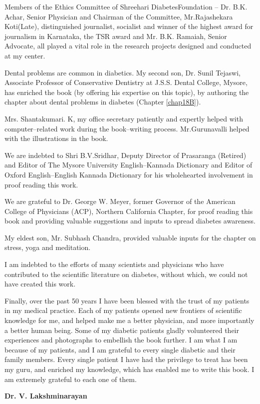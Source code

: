 Members of the Ethics Committee of Shreehari Diabetes\break Foundation – Dr. B.K. Achar, Senior Physician and Chairman of the Committee, Mr.Rajashekara Koti(Late), distinguished journa\-list, socia\-list and winner of the highest award for journalism in Karnataka, the TSR award and Mr. B.K. Ramaiah, Senior Advocate, all played a vital role in the research projects designed and conducted at my center.

Dental problems are common in diabetics. My second son, Dr. Sunil Tejaswi, Associate Professor of Conservative Dentistry at J.S.S. Dental College, Mysore, has enriched the book (by offering his expertise on this topic), by authoring the chapter about dental problems in diabetes (Chapter \ref{chap18B}).

Mrs. Shantakumari. K, my office secretary patiently and expertly helped with computer–related work during the book–writing process. Mr.Gurunavalli helped with the illustrations in the book.

We are indebted to Shri B.V.Sridhar, Deputy Director of Prasaranga (Retired) and Editor of The Mysore University English–Kannada Dictionary and Editor of Oxford English–English Kannada Dictionary for his wholehearted involvement in proof reading this work.

We are grateful to Dr. George W. Meyer, former Governor of the American College of Physicians (ACP), Northern California Chapter, for proof reading this book and providing valuable suggestions and inputs to spread diabetes awareness.

My eldest son, Mr. Subhash Chandra, provided valuable inputs for the chapter on stress, yoga and meditation.

I am indebted to the efforts of many scientists and physicians who have contributed to the scientific literature on diabetes, without which, we could not have created this work.

Finally, over the past 50 years I have been blessed with the trust of my patients in my medical practice. Each of my patients opened new frontiers of scientific knowledge for me, and helped make me a better physician, and more importantly a better human being. Some of my dia\-betic patients gladly volunteered their experiences and photographs to embellish the book further. I am what I am because of my patients, and I am grateful to every single diabetic and their family members. Every single patient I have had the privilege to treat has been my guru, and enriched my knowledge, which has enabled me to write this book. I am extremely grateful to each one of them.

\begin{flushright}
\textbf{Dr. V. Lakshminarayan}
\end{flushright}

